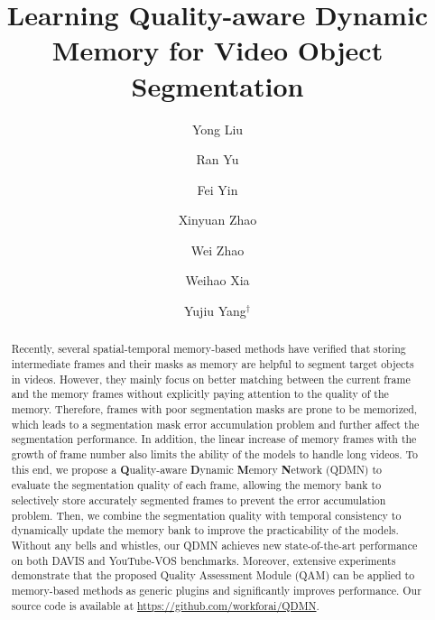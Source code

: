 \documentclass[runningheads]{llncs}
\begin{document}
\pagestyle{headings}
\mainmatter
\def\ECCVSubNumber{4636}  

\title{Learning Quality-aware Dynamic Memory for Video Object Segmentation} 

\author{Yong Liu\and
Ran Yu \and
Fei Yin \and
Xinyuan Zhao \and
Wei Zhao \and
Weihao Xia \and
Yujiu Yang$^{\dagger}$
}
\maketitle

\let\thefootnote\relax{}
\let\thefootnote\relax{}

\begin{abstract}
 
Recently, several spatial-temporal memory-based methods have verified that storing intermediate frames and their masks as memory are helpful to segment target objects in videos. However, they mainly focus on better matching between the current frame and the memory frames without explicitly paying attention to the quality of the memory. Therefore, frames with poor segmentation masks are prone to be memorized, which leads to a segmentation mask error accumulation problem and further affect the segmentation performance. In addition, the linear increase of memory frames with the growth of frame number also limits the ability of the models to handle long videos. To this end, we propose a \textbf{Q}uality-aware \textbf{D}ynamic \textbf{M}emory \textbf{N}etwork (QDMN) to evaluate the segmentation quality of each frame, allowing the memory bank to selectively store accurately segmented frames to prevent the error accumulation problem. Then, we combine the segmentation quality with temporal consistency to dynamically update the memory bank to improve the practicability of the models. Without any bells and whistles, our QDMN achieves new state-of-the-art performance on both DAVIS and YouTube-VOS benchmarks. Moreover, extensive experiments demonstrate that the proposed Quality Assessment Module (QAM) can be applied to memory-based methods as generic plugins and significantly improves performance.
Our source code is available at \textcolor{magenta}{\url{https://github.com/workforai/QDMN}}.





 \end{abstract}
\end{document}
